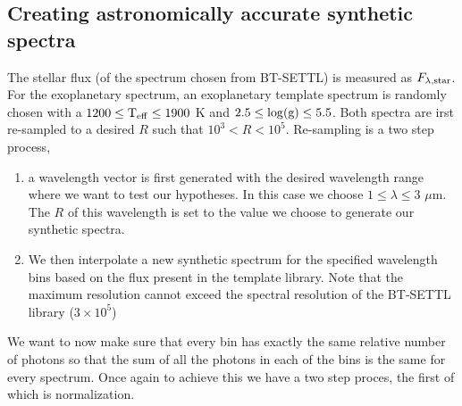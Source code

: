 \subsection{Creating astronomically accurate synthetic spectra}
The stellar flux (of the spectrum chosen from BT-SETTL) is measured as $F_{\rm{\lambda,star}}$.
For the exoplanetary spectrum, an exoplanetary template spectrum is randomly chosen with a $1200 \le \rm{T_{eff}} \le 1900$ K and  $2.5 \le \rm{\log(g)}\le  5.5$. 
Both spectra are irst re-sampled to a desired $R$ such that $10^3<R<10^5$.
Re-sampling is a two step process,
\begin{enumerate}
    \item a wavelength vector is first generated with the desired wavelength range where we want to test our hypotheses. 
    In this case we choose $1\le \lambda\le 3$ $\mu$m.
    The $R$ of this wavelength is set to the value we choose to generate our synthetic spectra.
    \item We then interpolate a new synthetic spectrum for the specified wavelength bins based on the flux present in the template library.
    Note that the maximum resolution cannot exceed the spectral resolution of the \textsc{BT-SETTL} library ($3\times10^{5}$)
\end{enumerate}
We want to now make sure that every bin has exactly the same relative number of photons so that the sum of all the photons in each of the bins is the same for every spectrum.
Once again to achieve this we have a two step proces, the first of which is normalization.
